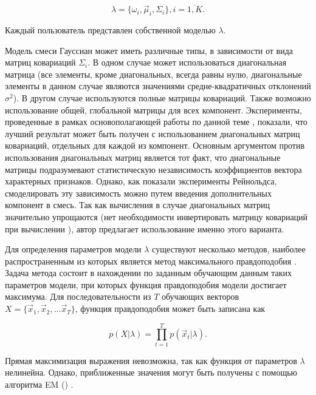 \begin{equation}
\lambda = \{ \omega_i, \vec \mu_i, \Sigma_i  \}, i = \overline{1,K}.
\end{equation}

Каждый пользователь представлен собственной моделью $\lambda$.

Модель смеси Гауссиан может иметь различные типы, в зависимости от вида матриц ковариаций $\Sigma_i$. В одном случае может использоваться диагональная матрица (все элементы, кроме диагональных, всегда равны нулю, диагональные элементы в данном случае являются значениями средне-квадратичных отклонений $\sigma^2$). В другом случае используются полные матрицы ковариаций. Также возможно использование общей, глобальной матрицы для всех компонент. Эксперименты, проведенные в рамках основополагающей работы по данной теме \cite{Reynolds95gmm}, показали, что лучший результат может быть получен с использованием диагональных матриц ковариаций, отдельных для каждой из компонент. Основным аргументом против использования диагональных матриц является тот факт, что диагональные матрицы подразумевают статистическую независимость коэффициентов вектора характерных признаков. Однако, как показали эксперименты Рейнольдса, смоделировать эту зависимость можно путем введения дополнительных компонент в смесь. Так как вычисления в случае диагональных матриц значительно упрощаются (нет необходимости инвертировать матрицу ковариаций при вычислении ), автор предлагает использование именно этого варианта.

Для определения параметров модели $\lambda$ существуют несколько методов, наиболее распространенным из которых является метод максимального правдоподобия \cite{BMSTUM17}. Задача метода состоит в нахождении по заданным обучающим данным таких параметров модели, при которых функция правдоподобия модели достигает максимума. Для последовательности из $T$ обучающих векторов $X = \{ \vec x_1, \vec x_2, \ldots \vec x_T \}$, функция правдоподобия может быть записана как

\begin{equation}
\label{eq:likelihood}
p(X | \lambda) = \prod_{t=1}^T p(\vec x_t | \lambda).
\end{equation}

\label{sec:analytic:em}
Прямая максимизация выражения  невозможна, так как функция от параметров $\lambda$ нелинейна. Однако, приближенные значения могут быть получены с помощью алгоритма EM () \cite{Dempster77EM}.

